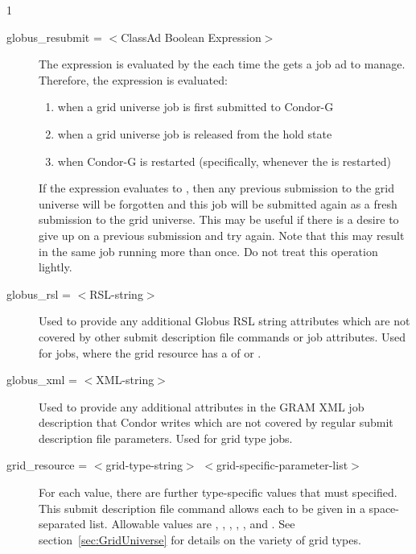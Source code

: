 \begin{ManPage}{\label{man-condor-submit}}{1}
\begin{description}

\item[globus\_resubmit = $<$ClassAd Boolean Expression$>$]
The expression is evaluated by the  each time
the  gets a job ad to manage.
Therefore, the expression is evaluated:
\begin{enumerate}
\item
   when a grid universe job is first submitted to Condor-G
\item
   when a grid universe job is released from the hold state
\item
   when Condor-G is restarted (specifically, whenever the 
   is restarted)
\end{enumerate}
If the expression evaluates to ,
then any previous submission to the grid universe will be
forgotten and this job will be submitted again as a fresh submission to
the grid universe.
This may be useful if there is a desire to give up on a
previous submission and try again.
Note that this may result in the same job running more than
once.  Do not treat this operation lightly.


\item[globus\_rsl = $<$RSL-string$>$]
Used to provide any additional Globus RSL
string attributes which are not covered by other submit description
file commands or job attributes. Used for  
jobs, where the grid resource has a  of
 or .


\item[globus\_xml = $<$XML-string$>$]
Used to provide any additional attributes in the GRAM XML job description
that Condor writes which are not covered by regular submit description
file parameters. Used for grid type  jobs.

\item[grid\_resource = $<$grid-type-string$>$ $<$grid-specific-parameter-list$>$ ]
For each  value, 
there are further type-specific values that must specified.
This submit description file command allows each to
be given in a space-separated list.
Allowable  values are
, , ,
, , and .
See section~\ref{sec:GridUniverse} for details on the variety of 
grid types.


\end{description}
\end{ManPage}
